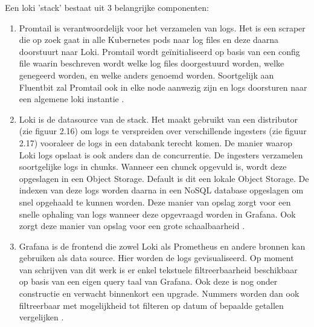 Een loki 'stack' bestaat uit 3 belangrijke componenten:
\begin{enumerate}
   \item Promtail is verantwoordelijk voor het verzamelen van logs. Het is een scraper die op zoek gaat in alle Kubernetes pods naar log files en deze daarna doorstuurt naar Loki. Promtail wordt geïnitialiseerd op basis van een config file waarin beschreven wordt welke log files doorgestuurd worden, welke genegeerd worden, en welke anders genoemd worden. Soortgelijk aan Fluentbit zal Promtail ook in elke node aanwezig zijn en logs doorsturen naar een algemene loki instantie \autocite{veeramachaneni2018}.
   \item Loki is de datasource van de stack. Het maakt gebruikt van een distributor (zie figuur 2.16) om logs te verspreiden over verschillende ingesters (zie figuur 2.17) vooraleer de logs in een databank terecht komen. De manier waarop Loki logs opslaat is ook anders dan de concurrentie. De ingesters verzamelen soortgelijke logs in chunks. Wanneer een chunck opgevuld is, wordt deze opgeslagen in een Object Storage. Default is dit een lokale Object Storage. De indexen van deze logs worden daarna in een NoSQL database opgeslagen om snel opgehaald te kunnen worden. Deze manier van opslag zorgt voor een snelle ophaling van logs wanneer deze opgevraagd worden in Grafana. Ook zorgt deze manier van opslag voor een grote schaalbaarheid \autocite{veeramachaneni2018}.
   \item Grafana is de frontend die zowel Loki als Prometheus en andere bronnen kan gebruiken als data source. Hier worden de logs gevisualiseerd. Op moment van schrijven van dit werk is er enkel tekstuele filtreerbaarheid beschikbaar op basis van een eigen query taal van Grafana. Ook deze is nog onder constructie en verwacht binnenkort een upgrade. Nummers worden dan ook filtreerbaar met mogelijkheid tot filteren op datum of bepaalde getallen vergelijken \autocite{githubLoki2019, veeramachaneni2018}. 
\end{enumerate}
